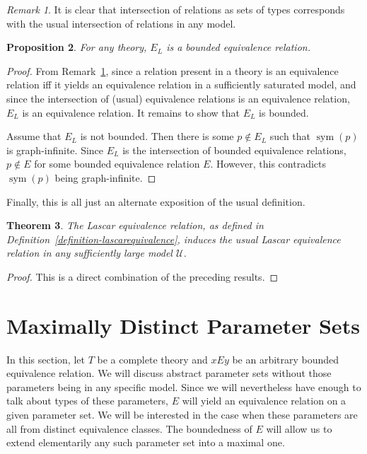 \documentclass[letterpaper,twoside]{article}
\newtheorem{theorem}{Theorem}[section]
\newtheorem{proposition}[theorem]{Proposition}
\theoremstyle{definition}
\theoremstyle{remark}
\newtheorem{remark}[theorem]{Remark}
\DeclareMathOperator{\sym}{sym}
\begin{document}
\begin{remark}\label{remark-relationintersection}
  It is clear that intersection of relations as sets of types
  corresponds with the usual intersection of relations in any model.
\end{remark}

\begin{proposition}
  For any theory, \(E_L\) is a bounded equivalence relation.
\end{proposition}
\begin{proof}
  From Remark~\ref{remark-relationintersection}, since a relation
  present in a theory is an equivalence relation iff it yields an
  equivalence relation in a sufficiently saturated model, and since
  the intersection of (usual) equivalence relations is an equivalence
  relation, \(E_L\) is an equivalence relation.  It remains to show
  that \(E_L\) is bounded.

  Assume that \(E_L\) is not bounded.  Then there is some \(p \notin
  E_L\) such that \(\sym(p)\) is graph-infinite.  Since \(E_L\) is the
  intersection of bounded equivalence relations, \(p \notin E\) for
  some bounded equivalence relation \(E\).  However, this contradicts
  \(\sym(p)\) being graph-infinite.
\end{proof}

Finally, this is all just an alternate exposition of the usual
definition.

\begin{theorem}
  The Lascar equivalence relation, as defined in
  Definition~\ref{definition-lascarequivalence}, induces the usual
  Lascar equivalence relation in any sufficiently large model
  \(\mathcal{U}\).
\end{theorem}
\begin{proof}
  This is a direct combination of the preceding results.
\end{proof}

\section{Maximally Distinct Parameter Sets}

In this section, let \(T\) be a complete theory and \(xEy\) be an
arbitrary bounded equivalence relation.  We will discuss abstract
parameter sets without those parameters being in any specific model.
Since we will nevertheless have enough to talk about types of these
parameters, \(E\) will yield an equivalence relation on a given
parameter set.  We will be interested in the case when these
parameters are all from distinct equivalence classes.  The boundedness
of \(E\) will allow us to extend elementarily any such parameter set
into a maximal one.
\end{document}
